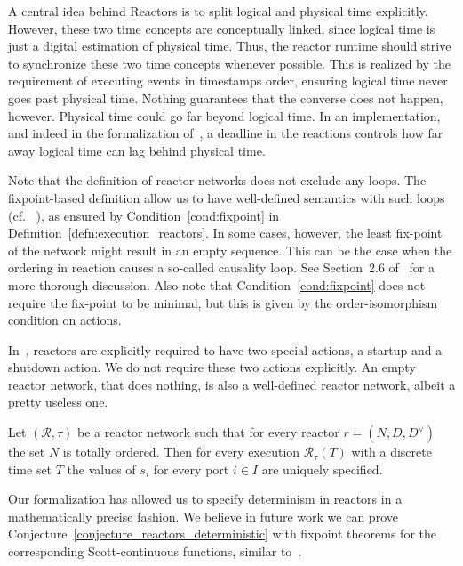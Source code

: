 A central idea behind Reactors is to split logical and physical time explicitly.
However, these two time concepts are conceptually linked, since logical time is just a digital estimation of physical time.
Thus, the reactor runtime should strive to synchronize these two time concepts whenever possible.
This is realized by the requirement of executing events in timestamps order, ensuring logical time never goes past physical time.
Nothing guarantees that the converse does not happen, however.
Physical time could go far beyond logical time.
In an implementation, and indeed in the formalization of~\cite{lohstroh_phdthesis}, a deadline in the reactions controls how far away logical time can lag behind physical time. 

Note that the definition of reactor networks does not exclude any loops.
The fixpoint-based definition allow us to have well-defined semantics with such loops (cf. ~\cite{kahn74,lee_matsikoudis_semantics}),
as ensured by Condition~\ref{cond:fixpoint} in Definition~\ref{defn:execution_reactors}.
In some cases, however, the least fix-point of the network might result in an empty sequence.
This can be the case when the ordering in reaction causes a so-called causality loop.
See Section~2.6 of~\cite{lohstroh_phdthesis} for a more thorough discussion.
Also note that Condition~\ref{cond:fixpoint} does not require the fix-point to be minimal, but this is given by the order-isomorphism condition on actions.

In~\cite{lohstroh_phdthesis}, reactors are explicitly required to have two special actions, a startup and a shutdown action.
We do not require these two actions explicitly.
An empty reactor network, that does nothing, is also a well-defined reactor network, albeit a pretty useless one.

\begin{conjecture}
    \label{conjecture_reactors_deterministic}
Let $(\mathcal{R},\tau)$ be a reactor network such that for every reactor $r = (N,D,D^\vee)$ the set $N$ is totally ordered.
Then for every execution $\mathcal{R}_\tau(T)$ with a discrete time set $T$ the values of $s_i$ for every port $i \in I$ are uniquely specified.
\end{conjecture}

Our formalization has allowed us to specify determinism in reactors in a mathematically precise fashion.
We believe in future work we can prove Conjecture~\ref{conjecture_reactors_deterministic} with fixpoint theorems for the corresponding Scott-continuous functions, similar to~\cite{kahn74}.

